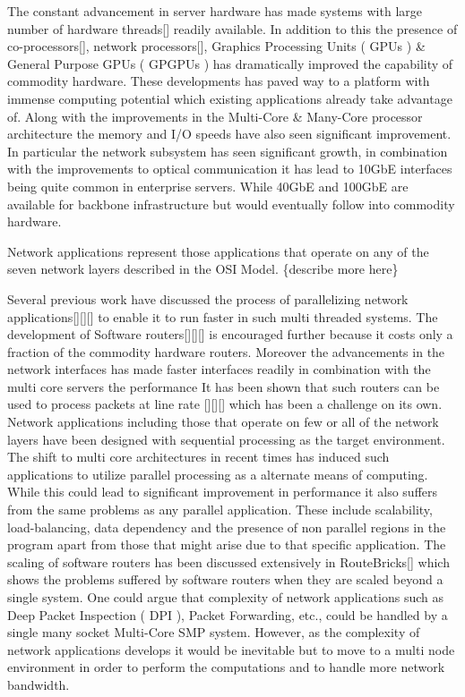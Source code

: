 \documentclass[conference]{IEEEtran}
\begin{document}
The constant advancement in server hardware has made systems with large number of hardware threads[] readily available. In addition to this the presence of co-processors[], network processors[], Graphics Processing Units ( GPUs ) \& General Purpose GPUs ( GPGPUs ) has dramatically improved the capability of commodity hardware. These developments has paved way to a platform with immense computing potential which existing applications already take advantage of. Along with the improvements in the Multi-Core \& Many-Core processor architecture the memory and I/O speeds have also seen significant improvement. In particular the network subsystem has seen significant growth, in combination with the improvements to optical communication it has lead to 10GbE interfaces being quite common in enterprise servers. While 40GbE and 100GbE are available for backbone infrastructure but would eventually follow into commodity hardware. 

Network applications represent those applications that operate on any of the seven network layers described in the OSI Model. \{describe more here\}

Several previous work have discussed the process of parallelizing network applications[][][] to enable it to run faster in such multi threaded systems. The development of Software routers[][][] is encouraged further because it costs only a fraction of the commodity hardware routers. Moreover the advancements in the network interfaces has made faster interfaces readily in combination with the multi core servers the performance  It has been shown that such routers can be used to process packets at line rate [][][] which has been a challenge on its own. Network applications including those that operate on few or all of the network layers have been designed with sequential processing as the target environment. The shift to multi core architectures in recent times has induced such applications to utilize parallel processing as a alternate means of computing. While this could lead to significant improvement in performance it also suffers from the same problems as any parallel application. These include scalability, load-balancing, data dependency and the presence of non parallel regions in the program apart from those that might arise due to that specific application. The scaling of software routers has been discussed extensively in RouteBricks[] which shows the problems suffered by software routers when they are scaled beyond a single system. One could argue that complexity of network applications such as Deep Packet Inspection ( DPI ), Packet Forwarding, etc., could be handled by a single many socket Multi-Core SMP system. However, as the complexity of network applications develops it would be inevitable but to move to a multi node environment in order to perform the computations and to handle more network bandwidth.
\end{document}
